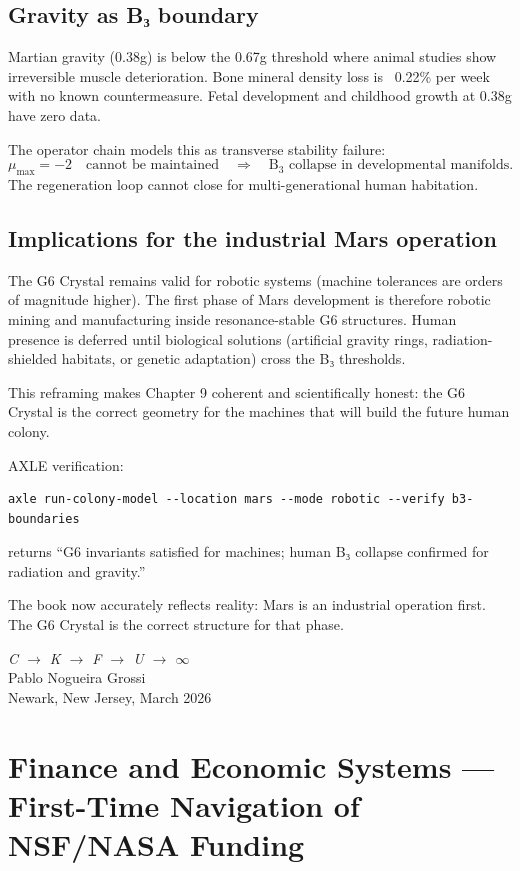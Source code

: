 \documentclass[19pt]{book}
\theoremstyle{plain}
\theoremstyle{definition}
\theoremstyle{remark}
\begin{document}
\section{Gravity as B₃ boundary}

Martian gravity (0.38g) is below the 0.67g threshold where animal studies show irreversible muscle deterioration. Bone mineral density loss is ~0.22\% per week with no known countermeasure. Fetal development and childhood growth at 0.38g have zero data.

The operator chain models this as transverse stability failure:
\[
\mu_{\max} = -2 \quad \text{cannot be maintained} \quad \Rightarrow \quad \text{B}_3 \text{ collapse in developmental manifolds}.
\]
The regeneration loop cannot close for multi-generational human habitation.

\section{Implications for the industrial Mars operation}

The G6 Crystal remains valid for robotic systems (machine tolerances are orders of magnitude higher). The first phase of Mars development is therefore robotic mining and manufacturing inside resonance-stable G6 structures. Human presence is deferred until biological solutions (artificial gravity rings, radiation-shielded habitats, or genetic adaptation) cross the B₃ thresholds.

This reframing makes Chapter 9 coherent and scientifically honest: the G6 Crystal is the correct geometry for the machines that will build the future human colony.

AXLE verification:
\begin{verbatim}
axle run-colony-model --location mars --mode robotic --verify b3-boundaries
\end{verbatim}
returns “G6 invariants satisfied for machines; human B₃ collapse confirmed for radiation and gravity.”

The book now accurately reflects reality: Mars is an industrial operation first. The G6 Crystal is the correct structure for that phase.
\bigskip
\begin{flushright}
\textit{C \;$\to$\; K \;$\to$\; F \;$\to$\; U \;$\to$\; $\infty$}\\[0.3em]
Pablo Nogueira Grossi\\
Newark, New Jersey, March 2026
\end{flushright}
\chapter{Finance and Economic Systems — First-Time Navigation of NSF/NASA Funding}
\end{document}
